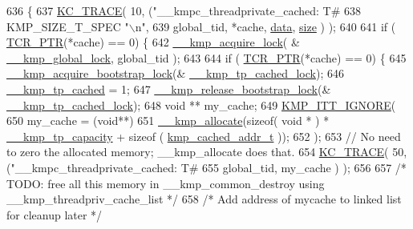 \begin{DoxyCode}
636   \{
637     \hyperlink{kmp__debug_8h_ab49eefbf8c74cfe98a90ce7ec8864add}{KC\_TRACE}( 10, (\textcolor{stringliteral}{"\_\_kmpc\_threadprivate\_cached: T#%
638                    KMP\_SIZE\_T\_SPEC \textcolor{stringliteral}{"\(\backslash\)n"},
639                    global\_tid, *cache, \hyperlink{ittnotify__static_8h_ae4b7aa9cddc8e1ade7c67ed7e338b18f}{data}, \hyperlink{ittnotify__static_8h_a5a1daa0c1d342747e3884fa54fc64fb1}{size} ) );
640 
641     \textcolor{keywordflow}{if} ( \hyperlink{kmp__os_8h_a6e40f65c18c7b47fb612607b9bf8fdfc}{TCR\_PTR}(*cache) == 0) \{
642         \hyperlink{kmp__lock_8h_a0eb3c836f2c88a4b8cad9535b53bafe0}{\_\_kmp\_acquire\_lock}( & \hyperlink{kmp_8h_a56af8af84b1717817c3abe69ecc8cc18}{\_\_kmp\_global\_lock}, global\_tid );
643 
644         \textcolor{keywordflow}{if} ( \hyperlink{kmp__os_8h_a6e40f65c18c7b47fb612607b9bf8fdfc}{TCR\_PTR}(*cache) == 0) \{
645             \hyperlink{kmp__lock_8h_a85412da5c0d085bde951a77690cf1f74}{\_\_kmp\_acquire\_bootstrap\_lock}(&
      \hyperlink{kmp_8h_a2105d949d5809163eef882ebdb896be0}{\_\_kmp\_tp\_cached\_lock});
646             \hyperlink{kmp_8h_a644251d4c84b1f4f3e9e40b666ea0de5}{\_\_kmp\_tp\_cached} = 1;
647             \hyperlink{kmp__lock_8h_a058b93e191c678dfe3e0b98bee82ff9b}{\_\_kmp\_release\_bootstrap\_lock}(&
      \hyperlink{kmp_8h_a2105d949d5809163eef882ebdb896be0}{\_\_kmp\_tp\_cached\_lock});
648             \textcolor{keywordtype}{void} ** my\_cache;
649             \hyperlink{kmp__itt_8h_a2461143f5948ba03b833429dded525bd}{KMP\_ITT\_IGNORE}(
650             my\_cache = (\textcolor{keywordtype}{void}**)
651                 \hyperlink{kmp_8h_aa6a69b47037dcffbfc5dba21a4a64d85}{\_\_kmp\_allocate}(\textcolor{keyword}{sizeof}( \textcolor{keywordtype}{void} * ) * 
      \hyperlink{kmp_8h_aaab3768311811ffdcd85f5a55bef2318}{\_\_kmp\_tp\_capacity} + \textcolor{keyword}{sizeof} ( \hyperlink{structkmp__cached__addr}{kmp\_cached\_addr\_t} ));
652                            );
653             \textcolor{comment}{// No need to zero the allocated memory; \_\_kmp\_allocate does that.}
654             \hyperlink{kmp__debug_8h_ab49eefbf8c74cfe98a90ce7ec8864add}{KC\_TRACE}( 50, (\textcolor{stringliteral}{"\_\_kmpc\_threadprivate\_cached: T#%
655                            global\_tid, my\_cache ) );
656             
657             \textcolor{comment}{/* TODO: free all this memory in \_\_kmp\_common\_destroy using \_\_kmp\_threadpriv\_cache\_list */}
658             \textcolor{comment}{/* Add address of mycache to linked list for cleanup later  */}
}}
\end{DoxyCode}
